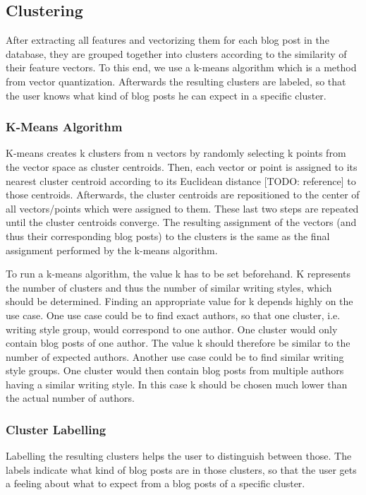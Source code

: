 \subsection{Clustering}
\label{sec:clustering}

After extracting all features and vectorizing them for each blog post in the database, they are grouped together into clusters according to the similarity of their feature vectors.
To this end, we use a k-means algorithm which is a method from vector quantization.
Afterwards the resulting clusters are labeled, so that the user knows what kind of blog posts he can expect in a specific cluster.

\subsubsection{K-Means Algorithm}
\label{sec:k-means}
K-means creates k clusters from n vectors by randomly selecting k points from the vector space as cluster centroids.
Then, each vector or point is assigned to its nearest cluster centroid according to its Euclidean distance [TODO: reference] to those centroids.
Afterwards, the cluster centroids are repositioned to the center of all vectors/points which were assigned to them.
These last two steps are repeated until the cluster centroids converge.
The resulting assignment of the vectors (and thus their corresponding blog posts) to the clusters is the same as the final assignment performed by the k-means algorithm.

To run a k-means algorithm, the value k has to be set beforehand.
K represents the number of clusters and thus the number of similar writing styles, which should be determined.
Finding an appropriate value for k depends highly on the use case.
One use case could be to find exact authors, so that one cluster, i.e. writing style group, would correspond to one author.
One cluster would only contain blog posts of one author.
The value k should therefore be similar to the number of expected authors.
Another use case could be to find similar writing style groups.
One cluster would then contain blog posts from multiple authors having a similar writing style.
In this case k should be chosen much lower than the actual number of authors.


\subsubsection{Cluster Labelling}
\label{sec:cluster_labeling}
Labelling the resulting clusters helps the user to distinguish between those.
The labels indicate what kind of blog posts are in those clusters, so that the user gets a feeling about what to expect from a blog posts of a specific cluster.

